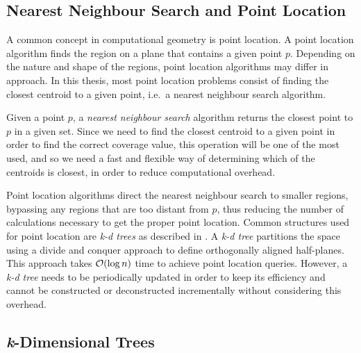 \subsection{Nearest Neighbour Search and Point Location}
A common concept in computational geometry is point location. A point location algorithm finds the region on a plane that contains a given point $p$. Depending on the nature and shape of the regions, point location algorithms may differ in approach. In this thesis, most point location problems consist of finding the closest centroid to a given point, i.e.\ a nearest neighbour search algorithm.

Given a point $p$, a \emph{nearest neighbour search} algorithm returns the closest point to $p$ in a given set. Since we need to find the closest centroid to a given point in order to find the correct coverage value, this operation will be one of the most used, and  so we need a fast and flexible way of determining which of the centroids is closest, in order to reduce computational overhead. 

Point location algorithms direct the nearest neighbour search to smaller regions, bypassing any regions that are too distant from $p$, thus reducing the number of calculations necessary to get the proper point location.
Common structures used for point location are \emph{k-d trees} as described in \citet{incrementalcov}. A \emph{k-d tree} partitions the space using a divide and conquer approach to define orthogonally aligned half-planes. This approach takes $\mathcal{O}(\log{n})$ time to achieve point location queries. However, a \emph{k-d tree} needs to be periodically updated in order to keep its efficiency and cannot be constructed or deconstructed incrementally without considering this overhead.

\subsection{\textit{k}-Dimensional Trees}

